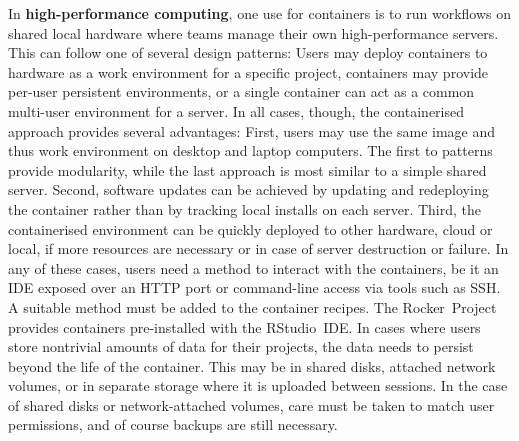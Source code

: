 In \textbf{high-performance computing}, one use for containers is to run
workflows on shared local hardware where teams manage their own
high-performance servers. This can follow one of several design
patterns: Users may deploy containers to hardware as a work environment
for a specific project, containers may provide per-user persistent
environments, or a single container can act as a common multi-user
environment for a server. In all cases, though, the containerised
approach provides several advantages: First, users may use the same
image and thus work environment on desktop and laptop computers. The
first to patterns provide modularity, while the last approach is most
similar to a simple shared server. Second, software updates can be
achieved by updating and redeploying the container rather than by
tracking local installs on each server. Third, the containerised
environment can be quickly deployed to other hardware, cloud or local,
if more resources are necessary or in case of server destruction or
failure. In any of these cases, users need a method to interact with the
containers, be it an IDE exposed over an HTTP port or command-line
access via tools such as SSH. A suitable method must be added to the
container recipes. The Rocker~Project provides containers pre-installed
with the RStudio~IDE. In cases where users store nontrivial amounts of
data for their projects, the data needs to persist beyond the life of
the container. This may be in shared disks, attached network volumes, or
in separate storage where it is uploaded between sessions. In the case
of shared disks or network-attached volumes, care must be taken to match
user permissions, and of course backups are still necessary.

